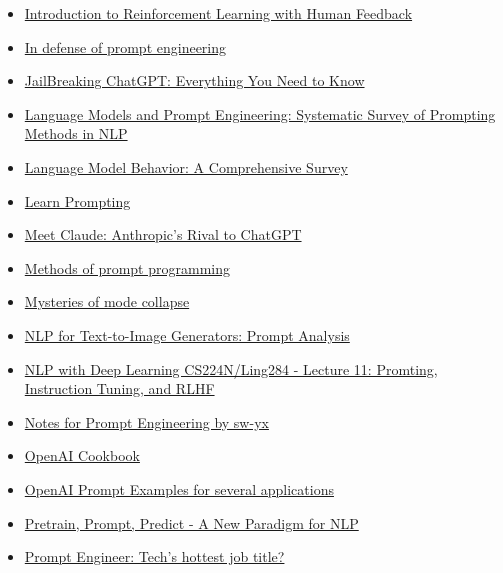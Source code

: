 \begin{itemize}
  \item \href{https://www.surgehq.ai/blog/introduction-to-reinforcement-learning-with-human-feedback-rlhf-series-part-1}{Introduction to Reinforcement Learning with Human Feedback}
  \item \href{https://simonwillison.net/2023/Feb/21/in-defense-of-prompt-engineering/}{In defense of prompt engineering}
  \item \href{https://metaroids.com/learn/jailbreaking-chatgpt-everything-you-need-to-know/}{JailBreaking ChatGPT: Everything You Need to Know}
  \item \href{https://youtube.com/watch?v=OsbUfL8w-mo&feature=shares}{Language Models and Prompt Engineering: Systematic Survey of Prompting Methods in NLP}
  \item \href{https://arxiv.org/abs/2303.11504}{Language Model Behavior: A Comprehensive Survey}
  \item \href{https://learnprompting.org}{Learn Prompting}
  \item \href{https://scale.com/blog/chatgpt-vs-claude}{Meet Claude: Anthropic’s Rival to ChatGPT}
  \item \href{https://generative.ink/posts/methods-of-prompt-programming}{Methods of prompt programming}
  \item \href{https://www.lesswrong.com/posts/t9svvNPNmFf5Qa3TA/mysteries-of-mode-collapse}{Mysteries of mode collapse}
  \item \href{https://heartbeat.comet.ml/nlp-for-text-to-image-generators-prompt-analysis-part-1-5076a44d8365}{NLP for Text-to-Image Generators: Prompt Analysis}
  \item \href{http://web.stanford.edu/class/cs224n/slides/cs224n-2023-lecture11-prompting-rlhf.pdf}{NLP with Deep Learning CS224N/Ling284 - Lecture 11: Promting, Instruction Tuning, and RLHF}
  \item \href{https://github.com/sw-yx/ai-notes}{Notes for Prompt Engineering by sw-yx}
  \item \href{https://github.com/openai/openai-cookbook}{OpenAI Cookbook}
  \item \href{https://platform.openai.com/examples}{OpenAI Prompt Examples for several applications}
  \item \href{http://pretrain.nlpedia.ai}{Pretrain, Prompt, Predict -  A New Paradigm for NLP}
  \item \href{https://www.peoplematters.in/article/talent-management/is-prompt-engineering-the-hottest-job-in-ai-today-37036}{Prompt Engineer: Tech's hottest job title?}

\end{itemize}
